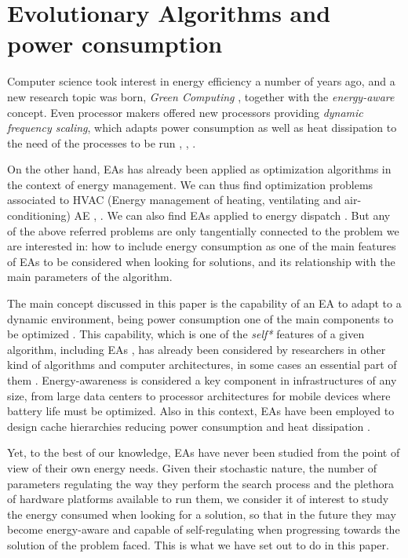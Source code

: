 \section{Evolutionary Algorithms and power consumption}
\label{eas}

Computer science took interest in energy efficiency a number of years
ago, and a new research topic was born, \textit{Green Computing}
\cite{green-computing}, together with the \textit{energy-aware}
\cite{energiaware,energy-aware} concept. Even processor 
makers offered new processors providing \textit{dynamic frequency
  scaling}, which adapts power consumption as well as heat dissipation
to the need of the processes to be run \cite{scaling},
\cite{dynamic-scaling}, \cite{energy-efficient}. 

On the other hand, EAs has already been applied as optimization
algorithms in the context of energy management.  We can thus find
optimization problems associated to HVAC (Energy management of
heating, ventilating and air-conditioning) AE \cite{HVAC},
\cite{chiller}.  We can also find EAs applied to energy dispatch
\cite{dispatch}.  But any of the above referred problems are only
tangentially connected to the problem we are interested in:  how to
include energy consumption as one of the main features of EAs to be
considered when looking for solutions, and its relationship with the
main parameters of the algorithm. 

The main concept discussed in this paper is the capability of an EA to adapt
to a dynamic environment, being power consumption one of the main
components to be optimized \cite{ephemeral}. This capability, which
is one of the \textit{self*} features of a
given algorithm, including EAs \cite{self}, has already been
considered by researchers in other kind of algorithms and computer architectures, in some cases
an essential part of them \cite{energy-aware}. Energy-awareness is
considered a key
component in infrastructures of any size, from large data centers to
processor architectures for mobile devices where battery life must be
optimized.  Also in this context, EAs have been employed to design
cache hierarchies reducing power consumption and heat dissipation
\cite{cache}. 

Yet, to the best of our knowledge, EAs have never been studied from
the point of view of their own energy needs. 
Given their stochastic nature, the number of parameters regulating the
way they perform the search process and the plethora of hardware
platforms available to run them, we consider it of interest to study
the energy consumed when looking for a solution, so that in the future
they may become energy-aware and capable of self-regulating when
progressing towards the solution of the problem faced. This is what we
have set out to do in this paper.

